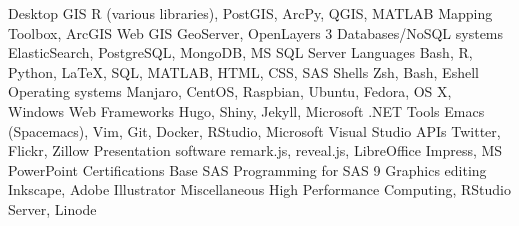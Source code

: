 \begin{cvtechskills}
    \cvtechskill    
        {Desktop GIS}
        {R (various libraries), PostGIS, ArcPy, QGIS, MATLAB Mapping Toolbox, ArcGIS}
        {}
        {}
    \cvtechskill    
        {Web GIS}
        {GeoServer, OpenLayers 3}
        {}
        {}
    \cvtechskill    
        {Databases/NoSQL systems}
        {ElasticSearch, PostgreSQL, MongoDB, MS SQL Server}
        {}
        {}
    \cvtechskill    
        {Languages}
        {Bash, R, Python, LaTeX, SQL, MATLAB, HTML, CSS, SAS}
        {}
        {}
    \cvtechskill    
        {Shells}
        {Zsh, Bash, Eshell}
        {}
        {}
    \cvtechskill    
        {Operating systems}
        {Manjaro, CentOS, Raspbian, Ubuntu, Fedora, OS X, Windows}
        {}
        {}  
    \cvtechskill    
        {Web Frameworks}
        {Hugo, Shiny, Jekyll, Microsoft .NET}
        {}
        {}  
    \cvtechskill
        {Tools}
        {Emacs (Spacemacs), Vim, Git, Docker, RStudio, Microsoft Visual Studio}
        {}
        {}
    \cvtechskill    
        {APIs}
        {Twitter, Flickr, Zillow}
        {}
        {}
    \cvtechskill    
        {Presentation software}
        {remark.js, reveal.js, LibreOffice Impress, MS PowerPoint}
        {}
        {}
    \cvtechskill
        {Certifications}
        {Base SAS Programming for SAS 9}
        {}
        {}
    \cvtechskill
        {Graphics editing}
        {Inkscape, Adobe Illustrator}
        {}
        {}
    \cvtechskill
        {Miscellaneous}
        {High Performance Computing, RStudio Server, Linode}
        {}
        {}
\end{cvtechskills}
